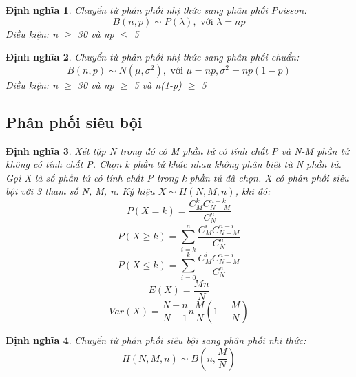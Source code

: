 \documentclass[12pt]{article}
\newtheorem{thm}{Định nghĩa}
\begin{document}
\begin{thm}
    Chuyển từ phân phối nhị thức sang phân phối Poisson:
    \begin{equation}
    B(n, p) \sim P(\lambda), \text{ với } \lambda = np
    \end{equation}
    Điều kiện: n $ \geq $ 30 và np $ \leq $ 5

\end{thm}
\begin{thm}
    Chuyển từ phân phối nhị thức sang phân phối chuẩn:
    \begin{equation}
    B(n, p) \sim N(\mu, \sigma^2), \text{ với } \mu = np, \sigma^2 = np(1 - p)
    \end{equation}
    Điều kiện: n $ \geq $ 30 và np $ \geq $ 5 và n(1-p) $ \geq $ 5
\end{thm}
 
\subsection{Phân phối siêu bội}
\begin{thm}
    Xét tập N trong đó có M phần tử có tính chất P và N-M phần tử không có tính chất P. 
    Chọn k phần tử khác nhau không phân biệt từ N phần tử. 
    Gọi X là số phần tử có tính chất P trong k phần tử đã chọn. 
    X có phân phối siêu bội với 3 tham số N, M, n. 
    Ký hiệu $X \sim H(N, M, n)$, khi đó:
    \begin{equation}
        P(X = k) = \frac{C_M^k C_{N-M}^{n-k}}{C_N^n}
    \end{equation}
    \begin{equation}
        P(X \geq k) = \sum_{i=k}^n \frac{C_M^i C_{N-M}^{n-i}}{C_N^n}
    \end{equation}
    \begin{equation}
        P(X \leq k) = \sum_{i=0}^k \frac{C_M^i C_{N-M}^{n-i}}{C_N^n}
    \end{equation}
    \begin{equation}
        E(X) = \frac{Mn}{N}
    \end{equation}
    \begin{equation}
        Var(X) = \frac{N-n}{N-1}n\frac{M}{N}(1 - \frac{M}{N})
    \end{equation}
\end{thm}
\begin{thm}
    Chuyển từ phân phối siêu bội sang phân phối nhị thức:
    \begin{equation}
    H(N, M, n) \sim B(n, \frac{M}{N})
    \end{equation}
\end{thm}
\end{document}
